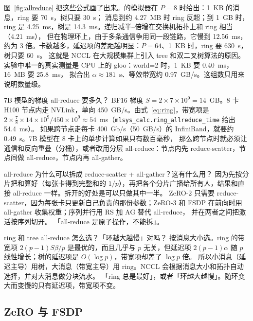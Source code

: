 图~\ref{fig:allreduce} 把这些公式画了出来。的模拟器在 $P=8$ 时给出：1~KB 的消息，ring 要 70~\textmu s，树只要 30~\textmu s；
消息到约 4.27~MB 时 ring 反超；到 1~GB 时，ring 是 4.25~ms，树是 14.3~ms。递归减半--倍增在交换机拓扑上和 ring 相当（4.21~ms），
但在物理环上，由于多条通信争用同一段链路，它慢到 12.56~ms，约为 3 倍。卡数越多，延迟项的差距越明显：$P=64$、1~KB 时，ring 要 630~\textmu s，树只要 60~\textmu s。
这就是 NCCL 在大规模集群上引入 tree 和双二叉树算法的原因。实验中唯一的真实测量是 CPU 上的 gloo：world=2 时，1~KB 要 0.40~ms，16~MB 要 25.8~ms，
拟合出 $\alpha\approx181$~\textmu s、等效带宽约 0.97~GB/s。这组数只用来说明数量级。

\begin{est}{7B 模型的梯度 all-reduce 要多久？}
BF16 梯度 $S=2\times7\times10^9=14$~GB。8 卡 H100 节点内走 NVLink，单向 450~GB/s。由式~\eqref{eq:ring}，带宽项是
$2\times\frac{7}{8}\times14\times10^9/450\times10^9\approx54$~ms（\texttt{mlsys\_calc.ring\_allreduce\_time} 给出 54.4~ms）。
如果跨节点走每卡 400~Gb/s（50~GB/s）的 InfiniBand，就要约 0.49~s。7B 模型在 8 卡上的单步计算如果只有数百毫秒，
那么跨节点时就必须让通信和反向重叠（分桶），或者改用分层 all-reduce：节点内先 reduce-scatter，节点间做 all-reduce，节点内再 all-gather。
\end{est}

\begin{qa}{all-reduce 为什么可以拆成 reduce-scatter + all-gather？这有什么用？}
\ans 因为先按分片把和算好（每张卡得到完整和的 $1/p$），再把各个分片广播给所有人，结果和直接 all-reduce 一样。拆开的好处是可以只做其中一半。
ZeRO-2 只需要 reduce-scatter，因为每张卡只更新自己负责的那份参数；ZeRO-3 和 FSDP 在前向时用 all-gather 收集权重；序列并行用 RS 加 AG 替代 all-reduce，
并在两者之间把激活按序列切开。
\wrong 「all-reduce 是原子操作，不能拆」。
\end{qa}

\begin{qa}{ring 和 tree all-reduce 怎么选？「环越大越慢」对吗？}
\ans 按消息大小选。ring 的带宽项 $2(p-1)S\beta/p$ 是最优的，而且几乎与 $p$ 无关，但延迟项 $2(p-1)\alpha$ 随 $p$ 线性增长；树的延迟项是 $O(\log p)$，带宽项却差了 $\log p$ 倍。
所以小消息（延迟主导）用树，大消息（带宽主导）用 ring。NCCL 会根据消息大小和拓扑自动选择，并对大消息做分块流水。
\wrong 「ring 总是最好」，或者「环越大越慢」。随环变大而变慢的只有延迟项，带宽项不变。
\end{qa}

\subsection{ZeRO 与 FSDP}

